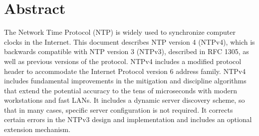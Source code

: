 \section*{Abstract}
\label{section-abstract}

The Network Time Protocol (NTP) is widely used to synchronize
computer clocks in the Internet. This document describes NTP version
4 (NTPv4), which is backwards compatible with NTP version 3 (NTPv3),
described in RFC 1305, as well as previous versions of the protocol.
NTPv4 includes a modified protocol header to accommodate the Internet
Protocol version 6 address family. NTPv4 includes fundamental
improvements in the mitigation and discipline algorithms that extend
the potential accuracy to the tens of microseconds with modern
workstations and fast LANs. It includes a dynamic server discovery
scheme, so that in many cases, specific server configuration is not
required. It corrects certain errors in the NTPv3 design and
implementation and includes an optional extension mechanism.
